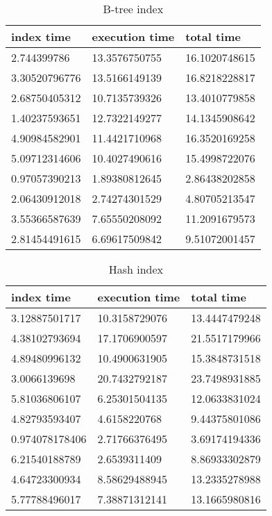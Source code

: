 \begin{itemize*}
\begin{table}[H]
\begin{center}
\begin{tabular}{|l|l|l|}
\hline
index time & execution time & total time                \\ \hline
2.744399786 & 13.3576750755 & 16.1020748615 \\ \hline
3.30520796776 & 13.5166149139 & 16.8218228817 \\ \hline
2.68750405312 & 10.7135739326 & 13.4010779858 \\ \hline
1.40237593651 & 12.7322149277 & 14.1345908642 \\ \hline
4.90984582901 & 11.4421710968 & 16.3520169258 \\ \hline
5.09712314606 & 10.4027490616 & 15.4998722076 \\ \hline
0.97057390213 & 1.89380812645 & 2.86438202858 \\ \hline
2.06430912018 & 2.74274301529 & 4.80705213547 \\ \hline
3.55366587639 & 7.65550208092 & 11.2091679573 \\ \hline
2.81454491615 & 6.69617509842 & 9.51072001457 \\ \hline
\end{tabular}
\end{center}
\caption{B-tree index}
\end{table}

\begin{table}[H]
\begin{center}
\begin{tabular}{|l|l|l|}
\hline
index time & execution time & total time     \\ \hline
3.12887501717 & 10.3158729076 & 13.4447479248 \\ \hline
4.38102793694 & 17.1706900597 & 21.5517179966 \\ \hline
4.89480996132 & 10.4900631905 & 15.3848731518 \\ \hline
3.0066139698 & 20.7432792187 & 23.7498931885 \\ \hline
5.81036806107 & 6.25301504135 & 12.0633831024 \\ \hline
4.82793593407 & 4.6158220768 & 9.44375801086 \\ \hline
0.974078178406 & 2.71766376495 & 3.69174194336 \\ \hline
6.21540188789 & 2.6539311409 & 8.86933302879 \\ \hline
4.64723300934 & 8.58629488945 & 13.2335278988 \\ \hline
5.77788496017 & 7.38871312141 & 13.1665980816 \\ \hline
\end{tabular}
\end{center}
\caption{Hash index}
\end{table}


\end{itemize*}
